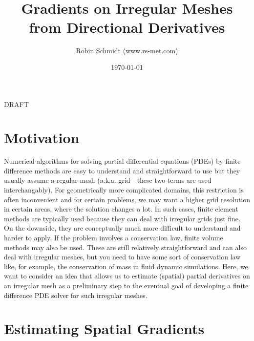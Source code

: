 \title{Gradients on Irregular Meshes from Directional Derivatives}
\author{Robin Schmidt (www.rs-met.com)}
\date{\today}
\maketitle

DRAFT

\section{Motivation}
Numerical algorithms for solving partial differential equations (PDEs) by finite difference methods are easy to understand and straightforward to use but they usually assume a regular mesh (a.k.a. grid - these two terms are used interchangably). For geometrically more complicated domains, this restriction is often inconvenient and for certain problems, we may want a higher grid resolution in certain areas, where the solution changes a lot. In such cases, finite element methods are typically used because they can deal with irregular grids just fine. On the downside, they are conceptually much more difficult to understand and harder to apply. If the problem involves a conservation law, finite volume methods may also be used. These are still relatively straightforward and can also deal with irregular meshes, but you need to have some sort of conservation law like, for example, the conservation of mass in fluid dynamic simulations. Here, we want to consider an idea that allows us to estimate (spatial) partial derivatives on an irregular mesh as a preliminary step to the eventual goal of developing a finite difference PDE solver for such irregular meshes.


\section{Estimating Spatial Gradients}
